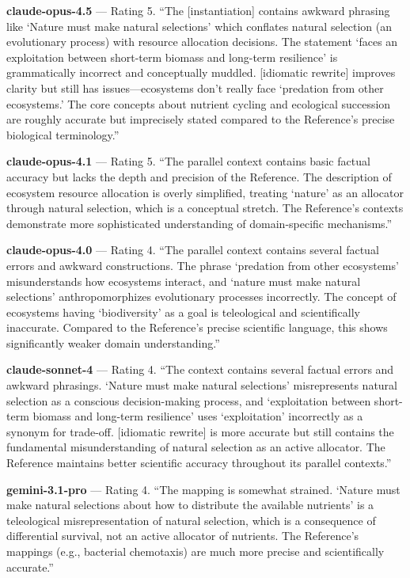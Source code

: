 \documentclass{article}
\begin{document}
\textbf{claude-opus-4.5} --- Rating 5. ``The {[}instantiation{]} contains awkward phrasing like `Nature must make natural selections' which conflates natural selection (an evolutionary process) with resource allocation decisions. The statement `faces an exploitation between short-term biomass and long-term resilience' is grammatically incorrect and conceptually muddled. {[}idiomatic rewrite{]} improves clarity but still has issues---ecosystems don't really face `predation from other ecosystems.' The core concepts about nutrient cycling and ecological succession are roughly accurate but imprecisely stated compared to the Reference's precise biological terminology.''

\textbf{claude-opus-4.1} --- Rating 5. ``The parallel context contains basic factual accuracy but lacks the depth and precision of the Reference. The description of ecosystem resource allocation is overly simplified, treating `nature' as an allocator through natural selection, which is a conceptual stretch. The Reference's contexts demonstrate more sophisticated understanding of domain-specific mechanisms.''

\textbf{claude-opus-4.0} --- Rating 4. ``The parallel context contains several factual errors and awkward constructions. The phrase `predation from other ecosystems' misunderstands how ecosystems interact, and `nature must make natural selections' anthropomorphizes evolutionary processes incorrectly. The concept of ecosystems having `biodiversity' as a goal is teleological and scientifically inaccurate. Compared to the Reference's precise scientific language, this shows significantly weaker domain understanding.''

\textbf{claude-sonnet-4} --- Rating 4. ``The context contains several factual errors and awkward phrasings. `Nature must make natural selections' misrepresents natural selection as a conscious decision-making process, and `exploitation between short-term biomass and long-term resilience' uses `exploitation' incorrectly as a synonym for trade-off. {[}idiomatic rewrite{]} is more accurate but still contains the fundamental misunderstanding of natural selection as an active allocator. The Reference maintains better scientific accuracy throughout its parallel contexts.''

\textbf{gemini-3.1-pro} --- Rating 4. ``The mapping is somewhat strained. `Nature must make natural selections about how to distribute the available nutrients' is a teleological misrepresentation of natural selection, which is a consequence of differential survival, not an active allocator of nutrients. The Reference's mappings (e.g., bacterial chemotaxis) are much more precise and scientifically accurate.''
\end{document}

